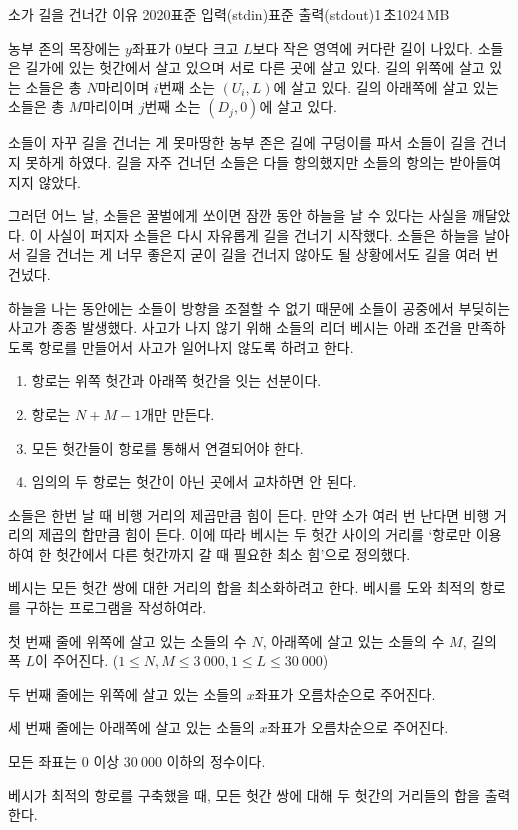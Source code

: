 \begin{problem}{소가 길을 건너간 이유 2020}{표준 입력(stdin)}{표준 출력(stdout)}{1\,초}{1024\,MB}
    
농부 존의 목장에는 $y$좌표가 $0$보다 크고 $L$보다 작은 영역에 커다란 길이 나있다. 소들은 길가에 있는 헛간에서 살고 있으며 서로 다른 곳에 살고 있다. 길의 위쪽에 살고 있는 소들은 총 $N$마리이며 $i$번째 소는 $\left(U_i, L\right)$에 살고 있다. 길의 아래쪽에 살고 있는 소들은 총 $M$마리이며 $j$번째 소는 $\left(D_j, 0\right)$에 살고 있다.

소들이 자꾸 길을 건너는 게 못마땅한 농부 존은 길에 구덩이를 파서 소들이 길을 건너지 못하게 하였다. 길을 자주 건너던 소들은 다들 항의했지만 소들의 항의는 받아들여지지 않았다.

그러던 어느 날, 소들은 꿀벌에게 쏘이면 잠깐 동안 하늘을 날 수 있다는 사실을 깨달았다. 이 사실이 퍼지자 소들은 다시 자유롭게 길을 건너기 시작했다. 소들은 하늘을 날아서 길을 건너는 게 너무 좋은지 굳이 길을 건너지 않아도 될 상황에서도 길을 여러 번 건넜다.

하늘을 나는 동안에는 소들이 방향을 조절할 수 없기 때문에 소들이 공중에서 부딪히는 사고가 종종 발생했다. 사고가 나지 않기 위해 소들의 리더 베시는 아래 조건을 만족하도록 항로를 만들어서 사고가 일어나지 않도록 하려고 한다.

\begin{enumerate}
    \item 항로는 위쪽 헛간과 아래쪽 헛간을 잇는 선분이다.
    \item 항로는 $N+M-1$개만 만든다.
    \item 모든 헛간들이 항로를 통해서 연결되어야 한다.
    \item 임의의 두 항로는 헛간이 아닌 곳에서 교차하면 안 된다.
\end{enumerate}

소들은 한번 날 때 비행 거리의 제곱만큼 힘이 든다. 만약 소가 여러 번 난다면 비행 거리의 제곱의 합만큼 힘이 든다. 이에 따라 베시는 두 헛간 사이의 거리를 `항로만 이용하여 한 헛간에서 다른 헛간까지 갈 때 필요한 최소 힘'으로 정의했다.

베시는 모든 헛간 쌍에 대한 거리의 합을 최소화하려고 한다. 베시를 도와 최적의 항로를 구하는 프로그램을 작성하여라.

\InputFile
첫 번째 줄에 위쪽에 살고 있는 소들의 수 $N$, 아래쪽에 살고 있는 소들의 수 $M$, 길의 폭 $L$이 주어진다. ($1 \le N, M \le 3\ 000, 1 \le L \le 30\ 000$)

두 번째 줄에는 위쪽에 살고 있는 소들의 $x$좌표가 오름차순으로 주어진다.

세 번째 줄에는 아래쪽에 살고 있는 소들의 $x$좌표가 오름차순으로 주어진다.

모든 좌표는 $0$ 이상 $30\ 000$ 이하의 정수이다.

\OutputFile
베시가 최적의 항로를 구축했을 때, 모든 헛간 쌍에 대해 두 헛간의 거리들의 합을 출력한다.

\Examples

\begin{example}
%
\end{example}

\end{problem}
